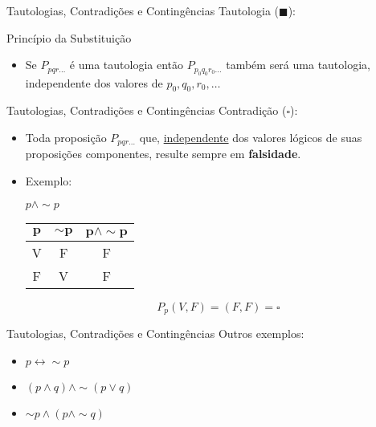 \begin{frame}[t]{Tautologias, Contradições e Contingências} %
	Tautologia ($\blacksquare$):\\
	\begin{center}Princípio da Substituição\end{center}
	\begin{itemize}
	\item Se $P_{pqr\ldots}$ é uma tautologia então $P_{p_0q_0r_0\ldots}$ também será uma tautologia, independente dos valores de $p_0, q_0, r_0, \ldots$ 
	\end{itemize}
\end{frame}

\begin{frame}[t]{Tautologias, Contradições e Contingências} %
	Contradição ($\square$):
	\begin{itemize}
	\item Toda proposição $P_{pqr\ldots}$ que, \underline{independente} dos valores lógicos de suas proposições componentes, resulte sempre em {\bf falsidade}.
	\item Exemplo: \begin{center}$p \wedge \sim p$ \end{center}

	\vskip 1cm

	\begin{center}
	\begin{tabular}{|c|c|c|}
	\hline
	$\mathbf{p}$ & $\mathbf{\sim p}$ & $\mathbf{p \wedge \sim p}$ \\
	\hline
	V & F & F \\
	\hline
	F & V & F \\
	\hline
	\end{tabular}
	\end{center}
	
	$$P_p(V, F) = (F, F) = \square$$
	\end{itemize}
\end{frame}

\begin{frame}[t]{Tautologias, Contradições e Contingências} %
	Outros exemplos:
	\begin{itemize}
	\item $p \leftrightarrow\sim p$
	\item $(p \wedge q) \wedge \sim (p \vee q)$
	\item $\sim p \wedge (p \wedge \sim q)$
	\end{itemize}
\end{frame}

